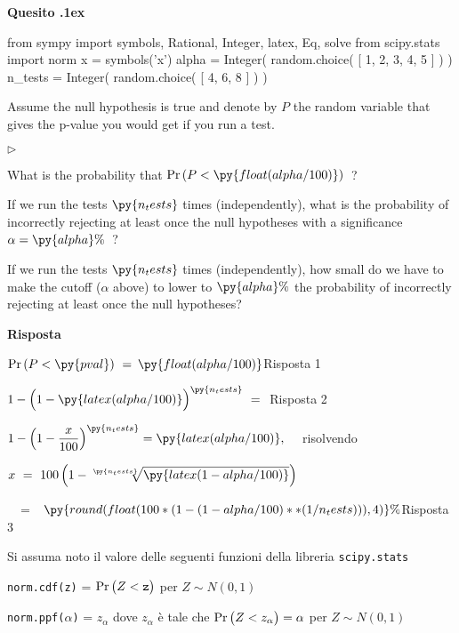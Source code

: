 \documentclass[11pt,twoside,a4paper]{article}
\newcommand{\mylabel}[1]{#1\hfill}
\renewenvironment{itemize}
  {\begin{list}{$\triangleright$}{%
   \setlength{\parskip}{0mm}
   \setlength{\topsep}{.4\baselineskip}
   \setlength{\rightmargin}{0mm}
   \setlength{\listparindent}{0mm}
   \setlength{\itemindent}{0mm}
   \setlength{\labelwidth}{2ex}
   \setlength{\itemsep}{.4\baselineskip}
   \setlength{\parsep}{0mm}
   \setlength{\partopsep}{0mm}
   \setlength{\labelsep}{1ex}
   \setlength{\leftmargin}{\labelwidth+\labelsep}
   \let\makelabel\mylabel}}{%
   \end{list}\vspace*{-1.3mm}}
\def\Pr{{\rm Pr\,}}
\newcounter{quesito}
\newenvironment{question}{\bigskip\addtocounter{quesito}{1}\par\textbf{Quesito \thequesito.\kern1ex}}{\vspace{\parskip}}
\newenvironment{answer}{\par\textbf{Risposta\quad}}{\vspace{\parskip}}
\begin{document}
\clearpage
\begin{question} %
\begin{pycode}
from sympy import symbols, Rational, Integer, latex, Eq, solve
from scipy.stats import norm
x = symbols('x')
alpha = Integer( random.choice( [ 1, 2, 3, 4, 5 ] ) )
n_tests = Integer( random.choice( [ 4, 6, 8 ] ) )
\end{pycode}
Assume the null hypothesis is true and denote by $P$ the random variable that gives the p-value you would get if you run a test.

\begin{itemize}
\item[1.] What is the probability that $\Pr(P<\py{float(alpha/100) })$~?

\item[2.] If we run the tests $\py{n_tests}$ times (independently), what is the probability of incorrectly rejecting at least once the null hypotheses with a significance $\alpha=\py{alpha}\%$~?

\item[3.] If we run the tests $\py{n_tests}$ times (independently), how small do we have to make the cutoff ($\alpha$ above) to lower to $\py{alpha}\%$ the probability of incorrectly rejecting at least once the null hypotheses? 
\end{itemize}

\begin{answer}

$\Pr(P<\py{pval})\ =\ ${\color{blue}$\py{float(alpha/100) }$\hfill Risposta 1}


$\displaystyle 1-\Big(1-\py{latex(alpha/100) }\Big)^{\py{n_tests}}\ =\  ${\color{blue} \hfill Risposta 2}

$\displaystyle 1-\Big(1-\frac{x}{100}\Big)^{\py{n_tests}}=\py{latex(alpha/100) }, \quad$ 
risolvendo 

$\displaystyle x\ =\ 100\,\Big( 1-\sqrt[\py{n_tests}]{\py{latex(1-alpha/100) } }\Big)$\medskip

$\displaystyle\phantom{x}\ =$ {\color{blue}$\kern1ex\py{round(float( 100*( 1- (1-alpha/100)**(1/n_tests) ) ), 4) }\%$\hfill Risposta 3}




\end{answer}
\end{question}











\vfill
\hrulefill

Si assuma noto il valore delle seguenti funzioni della libreria {\tt scipy.stats\/}

{\tt norm.cdf(z)} = $\Pr\big(Z<{\tt z}\big)$ per $Z\sim N(0,1)$ 

{\tt norm.ppf($\alpha$)} = $z_\alpha$ dove $z_\alpha$ è tale che $\Pr\big(Z<z_\alpha\big)=\alpha$ per $Z\sim N(0,1)$ 
\end{document}
